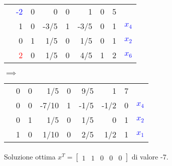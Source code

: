 \documentclass{article}
\begin{document}
\begin{preview}
                \paragraph{}
                \begin{tabular}{r | r r r r r r | r | r}
                        \cline{2-8}
                        & \textcolor{blue}{-2} & 0 & 0 & 0 & 1 & 0 & 5 & \\
                        \cline{2-8}
                        & 1 & 0 & -3/5 & 1 & -3/5 & 0 & 1 & \textcolor{blue}{ $ x_4 $ } \\
                        & 0 & 1 & 1/5 & 0 & 1/5 & 0 & 1 & \textcolor{blue}{$ x_2 $ } \\
                        & \textcolor{red}{2} & 0 & 1/5 & 0 & 4/5 & 1 & 2 & \textcolor{blue}{$ x_6 $ } \\
                        \cline{2-8}
                \end{tabular}
                $\implies$
                \begin{tabular}{r | r r r r r r | r | r}
                        \cline{2-8}
                        & 0 & 0 & 1/5 & 0 & 9/5 & 1 & 7 & \\
                        \cline{2-8}
                        & 0 & 0 & -7/10 & 1 & -1/5 & -1/2 & 0 & \textcolor{blue}{ $ x_4 $ } \\
                        & 0 & 1 & 1/5 & 0 & 1/5 & 0 & 1 & \textcolor{blue}{$ x_2 $ } \\
                        & 1 & 0 & 1/10 & 0 & 2/5 & 1/2 & 1 & \textcolor{blue}{$ x_1 $ } \\
                        \cline{2-8}
                \end{tabular}

                \paragraph{}
                Soluzione ottima $ x^T = \begin{bmatrix} 1 & 1 & 0 & 0 & 0 \end{bmatrix} $ di valore -7.
        \end{preview}
\end{document}
